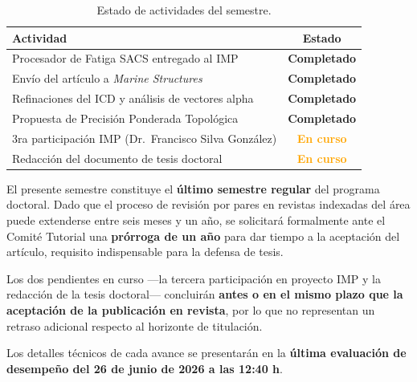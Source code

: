 \documentclass[12pt]{article}
\begin{document}
\begin{table}[h!]
  \centering
  \small
  \caption{Estado de actividades del semestre.}
  \begin{tabular}{lc}
    \toprule
    \textbf{Actividad} & \textbf{Estado} \\
    \midrule
    Procesador de Fatiga SACS entregado al IMP         & \textcolor{impgreen}{\textbf{Completado}} \\
    Envío del artículo a \textit{Marine Structures}    & \textcolor{impgreen}{\textbf{Completado}} \\
    Refinaciones del ICD y análisis de vectores alpha  & \textcolor{impgreen}{\textbf{Completado}} \\
    Propuesta de Precisión Ponderada Topológica        & \textcolor{impgreen}{\textbf{Completado}} \\
    3ra participación IMP (Dr.\ Francisco Silva González) & \textcolor{orange}{\textbf{En curso}} \\
    Redacción del documento de tesis doctoral            & \textcolor{orange}{\textbf{En curso}} \\
    \bottomrule
  \end{tabular}
\end{table}

El presente semestre constituye el \textbf{último semestre regular} del programa doctoral.
Dado que el proceso de revisión por pares en revistas indexadas del área puede extenderse
entre seis meses y un año, se solicitará formalmente ante el Comité Tutorial una
\textbf{prórroga de un año} para dar tiempo a la aceptación del artículo, requisito
indispensable para la defensa de tesis.

Los dos pendientes en curso ---la tercera participación en proyecto IMP y la redacción
de la tesis doctoral--- concluirán \textbf{antes o en el mismo plazo que la aceptación
de la publicación en revista}, por lo que no representan un retraso adicional respecto
al horizonte de titulación.

Los detalles técnicos de cada avance se presentarán en la \textbf{última evaluación
de desempeño del 26 de junio de 2026 a las 12:40 h}.
\end{document}
